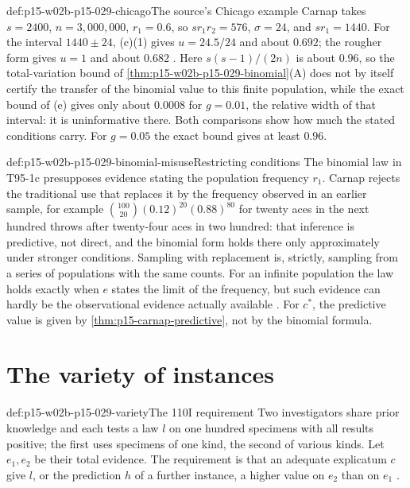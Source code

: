 \begin{hbexample}{def:p15-w02b-p15-029-chicago}{The source's Chicago example}
Carnap takes \(s=2400\), \(n=3{,}000{,}000\), \(r_1=0.6\), so
\(sr_1r_2=576\), \(\sigma=24\), and \(sr_1=1440\). For the interval
\(1440\pm24\), (c)(1) gives \(u=24.5/24\) and about \(0.692\); the
rougher form gives \(u=1\) and about \(0.682\)
\cite[sec.~96, pp.~506--507]{Carnap1950Probability}. Here
\(s(s-1)/(2n)\) is about \(0.96\), so the total-variation bound of
\cref{thm:p15-w02b-p15-029-binomial}(A) does not by itself certify the
transfer of the binomial value to this finite population, while the
exact bound of (e) gives only about \(0.0008\) for \(g=0.01\), the
relative width of that interval: it is uninformative there. Both comparisons show how much the stated
conditions carry. For \(g=0.05\) the exact bound gives at least
\(0.96\).
\end{hbexample}

\begin{hbwarning}{def:p15-w02b-p15-029-binomial-misuse}{Restricting conditions}
The binomial law in T95-1c presupposes evidence stating the population
frequency \(r_1\). Carnap rejects the traditional use that replaces it
by the frequency observed in an earlier sample, for example
\(\binom{100}{20}(0.12)^{20}(0.88)^{80}\) for twenty aces in the next
hundred throws after twenty-four aces in two hundred: that inference
is predictive, not direct, and the binomial form holds there only
approximately under stronger conditions. Sampling with replacement is,
strictly, sampling from a series of populations with the same counts.
For an infinite population the law holds exactly when \(e\) states the
limit of the frequency, but such evidence can hardly be the observational
evidence actually available \cite[sec.~95, pp.~499--502]{Carnap1950Probability}.
For \(c^*\), the predictive value is given by
\cref{thm:p15-carnap-predictive}, not by the binomial formula.
\end{hbwarning}

\section{The variety of instances}
\label{sec:p15-w02b-p15-029-variety}

\begin{hbdefinition}{def:p15-w02b-p15-029-variety}{The 110I requirement}
Two investigators share prior knowledge and each tests a law \(l\) on
one hundred specimens with all results positive; the first uses
specimens of one kind, the second of various kinds. Let \(e_1,e_2\) be
their total evidence. The requirement is that an adequate explicatum
\(c\) give \(l\), or the prediction \(h\) of a further instance, a
higher value on \(e_2\) than on \(e_1\)
\cite[sec.~110I, p.~575]{Carnap1950Probability}.
\end{hbdefinition}


